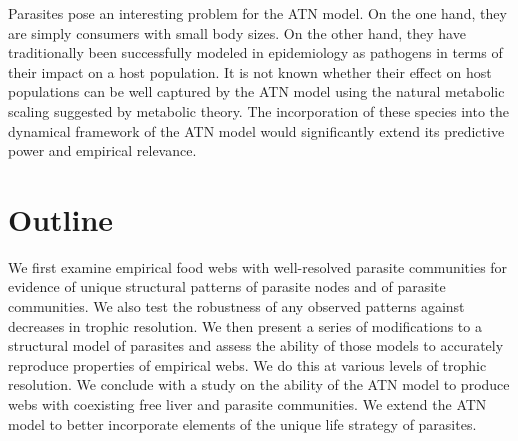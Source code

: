\documentclass[../dissertation.tex]{subfiles}
\begin{document}
\begin{bibunit}
Parasites pose an interesting problem for the ATN model. On the one hand, they
are simply consumers with small body sizes. On the other hand, they have
traditionally been successfully modeled in epidemiology as pathogens in terms
of their impact on a host population. It is not known whether their effect on
host populations can be well captured by the ATN model using the natural
metabolic scaling suggested by metabolic theory. The incorporation of these
species into the dynamical framework of the ATN model would significantly
extend its predictive power and empirical relevance.

\section{Outline}

We first examine empirical food webs with well-resolved parasite communities
for evidence of unique structural patterns of parasite nodes and of parasite
communities. We also test the robustness of any observed patterns against
decreases in trophic resolution. We then present a series of modifications to a
structural model of parasites and assess the ability of those models to
accurately reproduce properties of empirical webs. We do this at various levels
of trophic resolution. We conclude with a study on the ability of the ATN model
to produce webs with coexisting free liver and parasite communities. We extend
the ATN model to better incorporate elements of the unique life strategy of
parasites.

%
%
%
%
\clearpage
{}
\putbib
\end{bibunit} 
\end{document}
